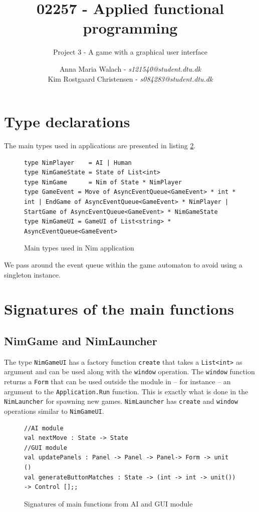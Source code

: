 \documentclass[10pt]{scrartcl}
\title{02257 - Applied functional programming}
\subtitle{Project 3 - A game with a graphical user interface}
\author{Anna Maria Walach - \textit {s121540@student.dtu.dk} \\ Kim Rostgaard Christensen - \textit {s084283@student.dtu.dk}}
\begin{document}
\maketitle
\section{Type declarations}
The main types used in applications are presented in listing \ref{list:types}. 
\begin{figure} [!ht]
\begin{lstlisting}
type NimPlayer    = AI | Human
type NimGameState = State of List<int>
type NimGame      = Nim of State * NimPlayer
type GameEvent = Move of AsyncEventQueue<GameEvent> * int * int | EndGame of AsyncEventQueue<GameEvent> * NimPlayer | StartGame of AsyncEventQueue<GameEvent> * NimGameState
type NimGameUI = GameUI of List<string> * AsyncEventQueue<GameEvent>
\end{lstlisting}
\caption{Main types used in Nim application}
\label{list:types}\end{figure}

We pass around the event queue within the game automaton to avoid using a singleton instance.
\section{Signatures of the main functions}
\subsection{NimGame and NimLauncher}
The type \texttt{NimGameUI} has a factory function \texttt{create} that takes a \texttt{List<int>} as argument and can be used along with the \texttt{window} operation. The \texttt{window} function returns a \texttt{Form} that can be used outside the module in -- for instance -- an argument to the \texttt{Application.Run} function. This is exactly what is done in the \texttt{NimLauncher} for spawning new games. \texttt{NimLauncher} has \texttt{create} and  \texttt{window} operations similar to \texttt{NimGameUI}.

\begin{figure} [!ht]
\begin{lstlisting}
//AI module
val nextMove : State -> State
//GUI module
val updatePanels : Panel -> Panel -> Panel-> Form -> unit ()
val generateButtonMatches : State -> (int -> int -> unit()) -> Control [];;
\end{lstlisting}
\caption{Signatures of main functions from AI and GUI module}
\label{list:types}
\end{figure}
\end{document}
